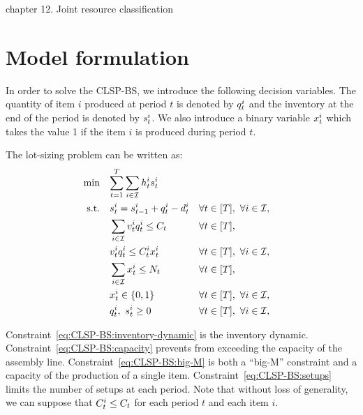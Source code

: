 
\cite{Pochet2006} chapter 12. Joint resource classification



\section{Model formulation}


In order to solve the CLSP-BS, we introduce the following decision variables. The quantity of item $i$ produced at period $t$ is denoted by $q_t^i$ and the inventory at the end of the period is denoted by $s_t^i$. We also introduce a binary variable $x_t^i$ which takes the value 1 if the item $i$ is produced during period $t$.

The lot-sizing problem can be written as:
\begin{subequations}\label{eq:CLSP-BS}
  \begin{align}
    \min\quad & \rlap{$\ds \sum_{t=1}^{\horizon} \sum_{i\in\REF} \holding_t^i \inventory_t^i$}
    \label{eq:CLSP-BS:objective}
    \\
    \st\quad & \ds \inventory_t^i = \inventory_{t-1}^i + \quantity_t^i - \demand_t^i && \forall t\in\range{\horizon},\ \forall i\in\REF,
    \label{eq:CLSP-BS:inventory-dynamic}
    \\
    & \ds \sum_{i\in\REF} \rate_t^i \quantity_t^i \le \capacity_t && \forall t\in\range{\horizon},
    \label{eq:CLSP-BS:capacity}
    \\
    & \ds \rate_t^i \quantity_t^i \le \capacity_t^i \setup_t^i && \forall t\in\range{\horizon},\ \forall i\in\REF,
    \label{eq:CLSP-BS:big-M}
    \\
    & \ds \sum_{i\in\REF} \setup_t^i \le \nbsetups_t && \forall t\in\range{\horizon},
    \label{eq:CLSP-BS:setups}
    \\
    & \ds \setup_t^i \in \crbracket{0,1} && \forall t\in\range{\horizon},\ \forall i\in\REF,
    \label{eq:CLSP-BS:boolean}
    \\
    & \ds \quantity_t^i,\ \inventory_t^i \ge 0 && \forall t\in\range{\horizon},\ \forall i\in\REF,
    \label{eq:CLSP-BS:positivity}
  \end{align}
\end{subequations}

Constraint~\eqref{eq:CLSP-BS:inventory-dynamic} is the inventory dynamic.
Constraint~\eqref{eq:CLSP-BS:capacity} prevents from exceeding the capacity of the assembly line.
Constraint~\eqref{eq:CLSP-BS:big-M} is both a ``big-M'' constraint and a capacity of the production of a single item.
Constraint~\eqref{eq:CLSP-BS:setups} limits the number of setups at each period.
Note that without loss of generality, we can suppose that $C_t^i \le C_t$ for each period $t$ and each item $i$.


